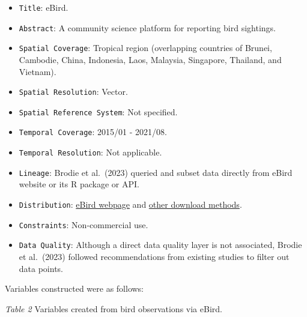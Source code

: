 \documentclass[
]{article}
\providecommand{\tightlist}{%
  \setlength{\itemsep}{0pt}\setlength{\parskip}{0pt}}
\begin{document}
\begin{itemize}
\tightlist
\item
  \texttt{Title}: eBird.
\item
  \texttt{Abstract}: A community science platform for reporting bird
  sightings.
\item
  \texttt{Spatial\ Coverage}: Tropical region (overlapping countries of
  Brunei, Cambodie, China, Indonesia, Laos, Malaysia, Singapore,
  Thailand, and Vietnam).
\item
  \texttt{Spatial\ Resolution}: Vector.
\item
  \texttt{Spatial\ Reference\ System}: Not specified.
\item
  \texttt{Temporal\ Coverage}: 2015/01 - 2021/08.
\item
  \texttt{Temporal\ Resolution}: Not applicable.
\item
  \texttt{Lineage}: Brodie et al.~(2023) queried and subset data
  directly from eBird website or its R package or API.
\item
  \texttt{Distribution}: \href{https://ebird.org/home}{eBird webpage}
  and
  \href{https://science.ebird.org/en/use-ebird-data/download-ebird-data-products}{other
  download methods}.
\item
  \texttt{Constraints}: Non-commercial use.
\item
  \texttt{Data\ Quality}: Although a direct data quality layer is not
  associated, Brodie et al.~(2023) followed recommendations from
  existing studies to filter out data points.
\end{itemize}

Variables constructed were as follows:

\emph{Table 2} Variables created from bird observations via eBird.
\end{document}
